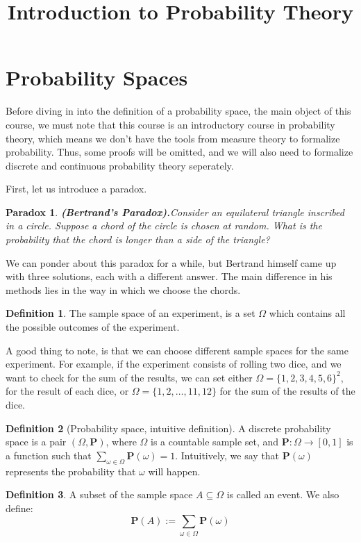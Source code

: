 \documentclass[11pt,a4paper]{article}
\title{\textbf{Introduction to Probability Theory}}
\author{}
\date{}
\theoremstyle{definition}
\newtheorem{definition}{Definition}[section]
\theoremstyle{plain}
\newtheorem{paradox}{Paradox}[section]
\newcommand{\Prob}{\mathbf{P}}
\renewcommand{\tt}[1]{\textnormal{\textbf{(#1).}}} %
\begin{document}
	\maketitle
	\newpage
  \section{Probability Spaces}
  Before diving in into the definition of a probability space, the main object
  of this course, we must note that this course is an introductory course in 
  probability theory, which means we don't have the tools from measure theory
  to formalize probability. Thus, some proofs will be omitted, and we will
  also need to formalize discrete and continuous probability theory seperately.

  First, let us introduce a paradox.
  \begin{paradox}
    \tt{Bertrand's Paradox}\label{par:ber}
    Consider an equilateral triangle inscribed in a circle. 
    Suppose a chord of the circle is chosen at random. 
    What is the probability that the chord is longer than a side of the 
    triangle? 
  \end{paradox}

  We can ponder about this paradox for a while, but Bertrand himself came up
  with three solutions, each with a different answer. The main difference in
  his methods lies in the way in which we choose the chords.

  \begin{definition}
    The sample space of an experiment, is a set $\Omega$ which contains all
    the possible outcomes of the experiment.
  \end{definition}

  A good thing to note, is that we can choose different sample spaces for the
  same experiment. For example, if the experiment consists of rolling two
  dice, and we want to check for the sum of the results, we can set either
  $\Omega = \{1,2,3,4,5,6\}^2$, for the result of each dice, or 
  $\Omega = \{1,2,\dots,11,12\}$ for the sum of the results of the dice. 

  \begin{definition}[Probability space, intuitive definition]
    A discrete probability space is a pair $(\Omega, \Prob)$, where
    $\Omega$ is a countable sample set, and $\Prob \colon \Omega \to 
    [0,1]$ is a function such that 
    $\sum_{\omega \in \Omega}{\Prob(\omega)} = 1$. 
    Intuitively, we say that $\Prob(\omega)$ represents the probability
    that $\omega$ will happen.
  \end{definition}
  \begin{definition}
    A subset of the sample space $A \subseteq \Omega$ is called an event.
    We also define:
    \[
      \Prob(A) := \sum_{\omega \in \Omega}{\Prob(\omega)}
    \]
  \end{definition}
  
\end{document}
